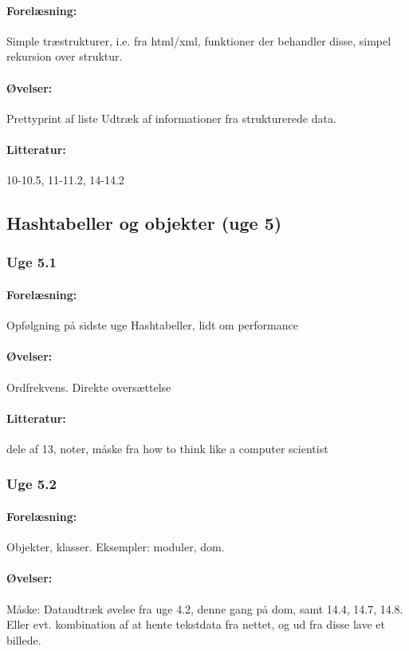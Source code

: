 \documentclass[12pt]{article}
\begin{document}
\paragraph{Forelæsning:} 
Simple træstrukturer, i.e. fra html/xml, funktioner der behandler disse, simpel rekursion over struktur.
\paragraph{Øvelser:}
Prettyprint af liste
Udtræk af informationer fra strukturerede data.
\paragraph{Litteratur:} 10-10.5, 11-11.2, 14-14.2

\subsection{Hashtabeller og objekter (uge 5)}
\subsubsection{Uge 5.1}
\paragraph{Forelæsning:} 
Opfølgning på sidste uge
Hashtabeller, lidt om performance
\paragraph{Øvelser:}
Ordfrekvens.
Direkte oversættelse
\paragraph{Litteratur:} dele af 13, noter, måske fra how to think like a computer scientist

\subsubsection{Uge 5.2}
\paragraph{Forelæsning:} 
Objekter, klasser.
Eksempler: moduler, dom.
\paragraph{Øvelser:}
Måske: Dataudtræk øvelse fra uge 4.2, denne gang på dom, samt  14.4, 14.7, 14.8. Eller evt. kombination af at hente tekstdata fra nettet, og ud fra disse lave et billede.
\end{document}
